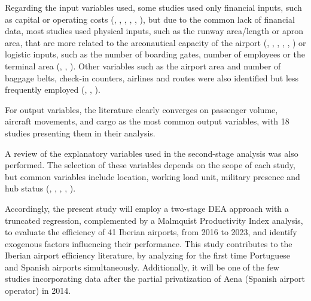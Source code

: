 Regarding the input variables used, some studies used only financial inputs, such as capital or operating costs (\cite{martin2001}, \cite{barros2008}, \cite{barrosdieke2008}, \cite{coto-millan2014}, \cite{coto-millan2016}, \cite{inglada2018}), but due to the common lack of financial data, most studies used physical inputs, such as the runway area/length or apron area, that are more related to the areonautical capacity of the airport (\cite{lin2006}, \cite{barros2008b}, \cite{tsekeris2011}, \cite{lozano2013}, \cite{fragoudaki2016}, \cite{gutierrez2016}) or logistic inputs, such as the number of boarding gates, number of employees or the terminal area (\cite{fung2008}, \cite{tovar2010}, \cite{martin2011}).
Other variables such as the airport area and number of baggage belts, check-in counters, airlines and routes were also identified but less frequently employed (\cite{lozano2013}, \cite{gutierrez2016}, \cite{cifuentes-faura2023}). 

For output variables, the literature clearly converges
on passenger volume, aircraft movements, and cargo as the most common output variables, with 18 studies presenting them in their analysis.

A review of the explanatory variables used in the second-stage analysis was also performed. The selection of these variables depends on the scope of each study, but common variables include location, working load unit, military presence and hub status (\cite{barrosdieke2008}, \cite{barros2008b}, \cite{tsekeris2011}, \cite{adler2013}, \cite{fragoudaki2016}).

Accordingly, the present study will employ a two-stage DEA approach with a truncated regression, complemented by a Malmquist Productivity Index analysis, to evaluate the efficiency of 41 Iberian airports, from 2016 to 2023, and identify exogenous factors influencing their performance. 
This study contributes to the Iberian airport efficiency literature, by analyzing for the first time Portuguese and Spanish airports simultaneously. Additionally, it will be one of the few studies incorporating data after the partial privatization of Aena (Spanish airport operator) in 2014. 